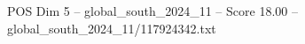 \begin{textsample}{POS Dim 5 – global\_south\_2024\_11 – Score 18.00 – global\_south\_2024\_11/117924342.txt}
\end{textsample}
